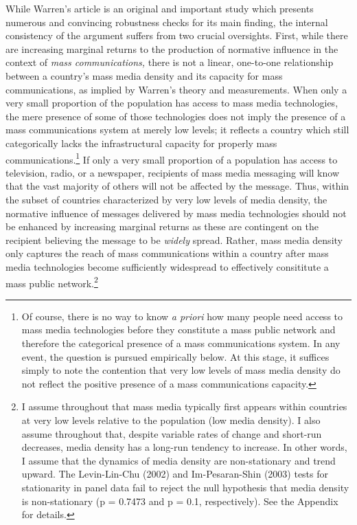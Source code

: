 \documentclass[11pt,article,oneside]{memoir}
\begin{document}
While Warren's article is an original and important study which presents
numerous and convincing robustness checks for its main finding, the
internal consistency of the argument suffers from two crucial
oversights. First, while there are increasing marginal returns to the
production of normative influence in the context of \emph{mass
communications,} there is not a linear, one-to-one relationship between
a country's mass media density and its capacity for mass communications,
as implied by Warren's theory and measurements. When only a very small
proportion of the population has access to mass media technologies, the
mere presence of some of those technologies does not imply the presence
of a mass communications system at merely low levels; it reflects a
country which still categorically lacks the infrastructural capacity for
properly mass communications.\footnote{Of course, there is no way to
  know \emph{a priori} how many people need access to mass media
  technologies before they constitute a mass public network and
  therefore the categorical presence of a mass communications system. In
  any event, the question is pursued empirically below. At this stage,
  it suffices simply to note the contention that very low levels of mass
  media density do not reflect the positive presence of a mass
  communications capacity.} If only a very small proportion of a
population has access to television, radio, or a newspaper, recipients
of mass media messaging will know that the vast majority of others will
not be affected by the message. Thus, within the subset of countries
characterized by very low levels of media density, the normative
influence of messages delivered by mass media technologies should not be
enhanced by increasing marginal returns as these are contingent on the
recipient believing the message to be \emph{widely} spread. Rather, mass
media density only captures the reach of mass communications within a
country after mass media technologies become sufficiently widespread to
effectively consititute a mass public network.\footnote{I assume
  throughout that mass media typically first appears within countries at
  very low levels relative to the population (low media density). I also
  assume throughout that, despite variable rates of change and short-run
  decreases, media density has a long-run tendency to increase. In other
  words, I assume that the dynamics of media density are non-stationary
  and trend upward. The Levin-Lin-Chu (2002) and Im-Pesaran-Shin (2003)
  tests for stationarity in panel data fail to reject the null
  hypothesis that media density is non-stationary (p = 0.7473 and p =
  0.1, respectively). See the Appendix for details.}
\end{document}
